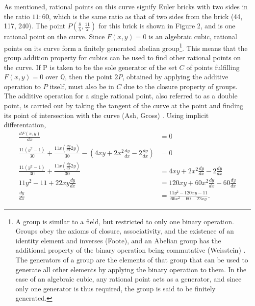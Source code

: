 \documentclass[11pt]{article}
\begin{document}
As mentioned, rational points on this curve signify Euler bricks with two sides in the ratio $11:60$, which is the same ratio as that of two sides from the brick (44, 117, 240). The point $P(\frac{8}{5},\frac{11}{2})$ for this brick is shown in Figure 2, and is one rational point on the curve. Since $F(x,y)=0$ is an algebraic cubic, rational points on its curve form a finitely generated abelian group\footnote{A group is similar to a field, but restricted to only one binary operation. Groups obey the axioms of closure, associativity, and the existence of an identity element and inverses (Foote), and an Abelian group has the additional property of the binary operation being commutative (Weisstein) \cite{axioms}\cite{abgroup}. The generators of a group are the elements of that group that can be used to generate all other elements by applying the binary operation to them. In the case of an algebraic cubic, any rational point acts as a generator, and since only one generator is thus required, the group is said to be finitely generated.}. This means that the group addition property for cubics can be used to find other rational points on the curve. If P is taken to be the sole generator of the set $C$ of points fulfilling $F(x,y)=0$ over $\mathbb{Q}$, then the point $2P$, obtained by applying the additive operation to $P$ itself, must also be in $C$ due to the closure property of groups. The additive operation for a single rational point, also referred to as a double point, is carried out by taking the tangent of the curve at the point and finding its point of intersection with the curve (Ash, Gross) \cite{elliptict}. Using implicit differentation, 
\begin{equation*}
\begin{aligned}
\frac{dF(x,y)}{dx}&=0 \\
\frac{11(y^2-1)}{30}+\frac{11x(\frac{dy}{dx}2y)}{30}-(4xy+2x^2\frac{dy}{dx}-2\frac{dy}{dx})&=0 \\
\frac{11(y^2-1)}{30}+\frac{11x(\frac{dy}{dx}2y)}{30}&=4xy+2x^2\frac{dy}{dx}-2\frac{dy}{dx} \\
11y^2-11+22xy\frac{dy}{dx}&=120xy+60x^2\frac{dy}{dx}-60\frac{dy}{dx} \\
\frac{dy}{dx}&=\frac{11y^2-120xy-11}{60x^2-60-22xy}.
\end{aligned}
\end{equation*}
\end{document}
